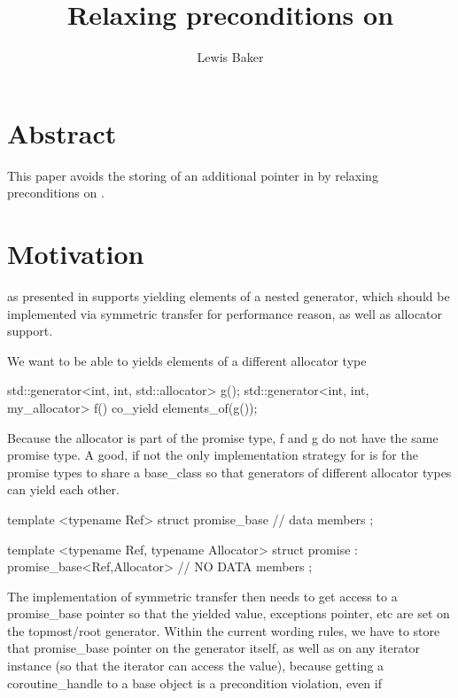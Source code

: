 \documentclass{wg21}
\title{Relaxing preconditions on \tcode{coroutine\_handle::from\_address}}
\author{Lewis Baker}{lewissbaker@gmail.com}
\begin{document}
\maketitle


\section{Abstract}
This paper avoids the storing of an additional pointer in  by relaxing preconditions on .


\section{Motivation}

 as presented in  supports yielding elements of a nested generator, which should be implemented via symmetric transfer for performance reason,
as well as allocator support.

We want to be able to yields elements of a different allocator type

\begin{colorblock}
    std::generator<int, int, std::allocator> g();
    std::generator<int, int, my_allocator> f() {
        co_yield elements_of(g());
    }
\end{colorblock}


Because the allocator is part of the promise type, f and g do not have the same promise type.
A good, if not the only implementation strategy for  is for the promise types to share a base_class so that generators of different allocator types can yield each other.

\begin{colorblock}
template <typename Ref>
struct promise_base {
   // data members
};

template <typename Ref, typename Allocator>
struct promise : promise_base<Ref,Allocator> {
    // NO DATA members
};
\end{colorblock}

The implementation of symmetric transfer then needs to get access to a promise_base pointer so that the yielded value, exceptions pointer, etc
are set on the topmost/root generator.
Within the current wording rules, we have to store that promise_base pointer on the generator itself, as well as on any iterator instance (so that the iterator can access the value),
because getting a coroutine_handle to a base object is a precondition violation, even if
\end{document}
